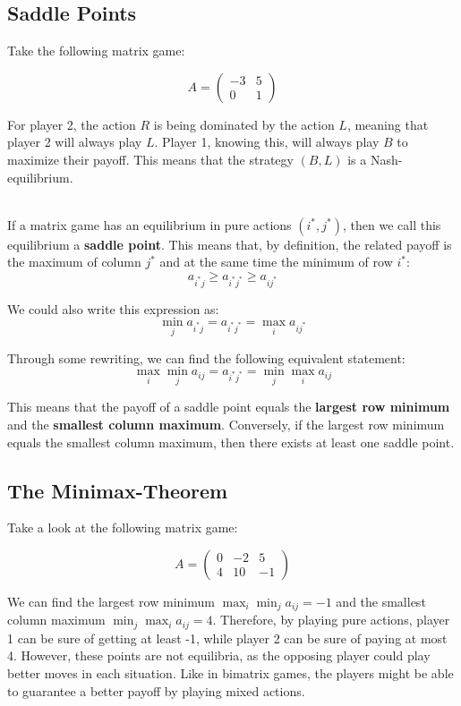 \documentclass[12pt]{article}
\begin{document}
\subsection{Saddle Points}
Take the following matrix game:

\[ A = \begin{pmatrix}
    -3 & 5 \\
    0 & 1
\end{pmatrix} \]

\noindent
For player 2, the action $R$ is being dominated by the action $L$, meaning that player 2 will always play $L$.
Player 1, knowing this, will always play $B$ to maximize their payoff.
This means that the strategy $(B, L)$ is a Nash-equilibrium.

\noindent
\\
If a matrix game has an equilibrium in pure actions $(i^*, j^*)$, then we call this equilibrium a \textbf{saddle point}.
This means that, by definition, the related payoff is the maximum of column $j^*$ and at the same time the minimum of row $i^*$:
\[ a_{i^* j} \geq a_{i^* j^*} \geq a_{i j^*} \]

\noindent
We could also write this expression as:
\[ \min_{j} a_{i^* j} = a_{i^* j^*} = \max_{i} a_{i j^*} \]

\noindent
Through some rewriting, we can find the following equivalent statement:
\[ \max_{i} \min_{j} a_{ij} = a_{i^* j^*} = \min_{j} \max_{i} a_{ij} \]

\noindent
This means that the payoff of a saddle point equals the \textbf{largest row minimum} and the \textbf{smallest column maximum}.
Conversely, if the largest row minimum equals the smallest column maximum, then there exists at least one saddle point.

\subsection{The Minimax-Theorem}
Take a look at the following matrix game:

\[ A = \begin{pmatrix}
    0 & -2 & 5 \\
    4 & 10 & -1
\end{pmatrix} \]

\noindent
We can find the largest row minimum $\max_{i} \min_{j} a_{ij} = -1$ and the smallest column maximum $\min_{j} \max_{i} a_{ij} = 4$.
Therefore, by playing pure actions, player 1 can be sure of getting at least -1, while player 2 can be sure of paying at most 4.
However, these points are not equilibria, as the opposing player could play better moves in each situation.
Like in bimatrix games, the players might be able to guarantee a better payoff by playing mixed actions.
\end{document}
